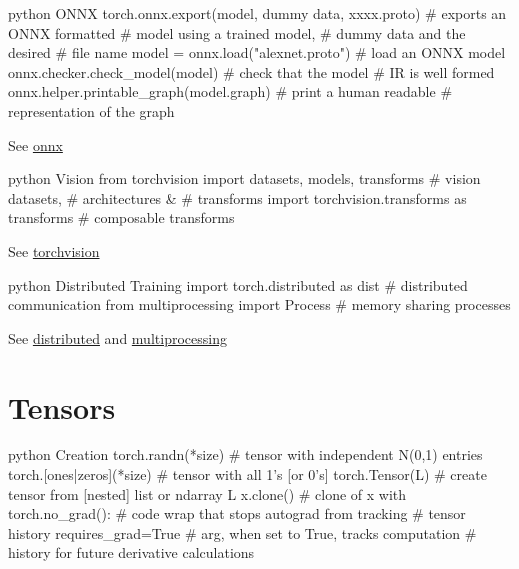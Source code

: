 \documentclass[10pt,a4paper]{article}
\begin{document}
\begin{multicols}{2}
\begin{codebox}{python}{\hypertarget{onnx}{%
ONNX\label{onnx}}}
torch.onnx.export(model, dummy data, xxxx.proto)    # exports an ONNX formatted 
                                                    # model using a trained model, 
                                                    # dummy data and the desired 
                                                    # file name
model = onnx.load("alexnet.proto")                  # load an ONNX model
onnx.checker.check_model(model)                     # check that the model
                                                    # IR is well formed
onnx.helper.printable_graph(model.graph)            # print a human readable
                                                    # representation of the graph
\end{codebox}

See \href{https://pytorch.org/docs/stable/onnx.html}{onnx}

\begin{codebox}{python}{\hypertarget{vision}{%
Vision\label{vision}}}
from torchvision import datasets, models, transforms    # vision datasets,
                                                        # architectures &
                                                        # transforms
import torchvision.transforms as transforms             # composable transforms
\end{codebox}

See
\href{https://pytorch.org/docs/stable/torchvision/index.html}{torchvision}

\begin{codebox}{python}{\hypertarget{distributed-training}{%
Distributed Training\label{distributed-training}}}
import torch.distributed as dist          # distributed communication
from multiprocessing import Process       # memory sharing processes
\end{codebox}

See \href{https://pytorch.org/docs/stable/distributed.html}{distributed}
and
\href{https://pytorch.org/docs/stable/multiprocessing.html}{multiprocessing}

\hypertarget{tensors}{%
\section{Tensors}\label{tensors}}

\begin{codebox}{python}{\hypertarget{creation}{%
Creation\label{creation}}}
torch.randn(*size)          # tensor with independent N(0,1) entries
torch.[ones|zeros](*size)   # tensor with all 1's [or 0's]
torch.Tensor(L)             # create tensor from [nested] list or ndarray L
x.clone()                   # clone of x
with torch.no_grad():       # code wrap that stops autograd from tracking 
                            # tensor history
requires_grad=True          # arg, when set to True, tracks computation
                            # history for future derivative calculations
\end{codebox}


\end{multicols}
\end{document}
